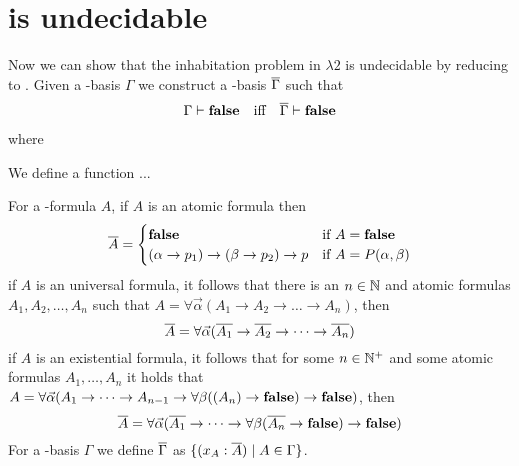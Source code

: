 \section{\lambdaInhab{} is undecidable}
Now we can show that the inhabitation problem in $\lambda2$ %
is undecidable by reducing \PCons{} to \lambdaInhab{}. Given a \SysP-basis $\Gamma$ we construct a \lambdaTwo-basis $\overline{\Gamma}$ such that 
\begin{align*}
\Gamma\vdash\textbf{false}&&\text{iff}&&\overline{\Gamma}\vdash\textbf{false}
\end{align*}
where \false{} 

\begin{definition}
We define a function ...

For a \SysP-formula $A$, if $A$ is an atomic formula then
\[
\trans{A}=
\begin{cases}
\false &\text{if $A=\false$}\\
(\alpha\to p_1)\to(\beta\to p_2)\to p &\text{if $A=P(\alpha,\beta)$} %
\end{cases}
\]
if $A$ is an universal formula, it follows that there is an $n\in\mathbb{N}$ and atomic formulas $A_1,A_2,\dots,A_n$ such that $A=\forall\vec{\alpha}(A_1\to A_2 \to\dots\to A_n)$, then %
\[\overline{A}=\forall\vec{\alpha}(\overline{A_1}\to \overline{A_2} \to\dots\to\overline{ A_n})\]
if $A$ is an existential formula, it follows that for some $n\in\mathbb{N}^+$ and some atomic formulas $A_1,\dots,A_n$ it holds that $A=\forall\vec{\alpha}(A_1 \to\dots\to A_{n-1}\to \forall\beta((A_n)\to\textbf{false})\to\textbf{false})$, then %
\[\overline{A}=\forall\vec{\alpha}(\overline{A_1}\to\dots\to\forall\beta(\overline{ A_n}\to\textbf{false})\to\textbf{false})\]
For a \SysP-basis $\Gamma$ we define $\overline{\Gamma}$ as $\{(x_A:\overline{A})\mid A\in\Gamma\}$.

\end{definition}


